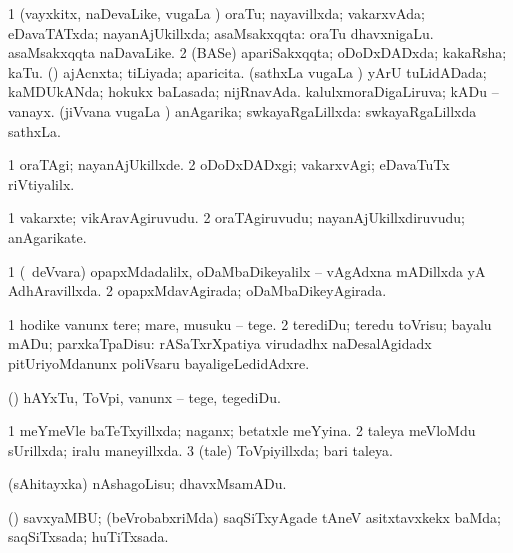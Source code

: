 {\bentry
{} 
\gl{\gu}
\bmng
\bnum
\num{1} (vayxkitx, naDevaLike, \mo vugaLa \vi) oraTu; nayavillxda; vakarxvAda; eDavaTATxda; nayanAjUkillxda; asaMsakxqqta:  oraTu dhavxnigaLu.  asaMsakxqqta naDavaLike. 
\num{2} (BASe) apariSakxqqta; oDoDxDADxda; kakaRsha; kaTu. 
 (\pArxparx) 
\banum
{} ajAcnxta; tiLiyada; aparicita. 
 (sathxLa \mo vugaLa \vi) yArU tuLidADada; kaMDUkANda; hokukx baLasada; nijRnavAda. 
 kalulxmoraDigaLiruva; kADu -- vanayx. 
 (jiVvana \mo vugaLa \vi) anAgarika; swkayaRgaLillxda:  swkayaRgaLillxda sathxLa. 
\eanum
\numie
\enum
\emng
\eentry

\bentry
{} 
\gl{\kirxvi}
\bmng
\bnum
\num{1} oraTAgi; nayanAjUkillxde. 
\num{2} oDoDxDADxgi; vakarxvAgi; eDavaTuTx riVtiyalilx. 
\enum
\emng
\eentry

\bentry
{} 
\gl{\nA}
\expl{}
\bmng
\bnum
\num{1} vakarxte; vikAravAgiruvudu. 
\num{2} oraTAgiruvudu; nayanAjUkillxdiruvudu; anAgarikate. 
\enum
\emng
\eentry

\bentry
{} 
\gl{\gu}
\expl{}
\bmng
\bnum
\num{1} (\kanmu\ deVvara) opapxMdadalilx, oDaMbaDikeyalilx -- vAgAdxna mADillxda yA AdhAravillxda. 
\num{2} opapxMdavAgirada; oDaMbaDikeyAgirada. 
\enum
\emng
\eentry

\bentry
{} 
\gl{\sakirx}
\expl{}
\bmng
\bnum
\num{1} hodike \mo vanunx tere; mare, musuku -- tege. 
\num{2} terediDu; teredu toVrisu; bayalu mADu; parxkaTpaDisu:  rASaTxrXpatiya virudadhx naDesalAgidadx pitUriyoMdanunx poliVsaru bayaligeLedidAdxre. 
\enum
\emng

\noindent 
\gl{\akirx}
\expl{}
\bmng
(\pArxparx) hAYxTu, ToVpi, \mo vanunx -- tege, tegediDu. 
\emng
\eentry

\bentry
{} 
\gl{\gu}
\expl{}
\bmng
\bnum
\num{1} meYmeVle baTeTxyillxda; naganx; betatxle meYyina. 
\num{2} taleya meVloMdu sUrillxda; iralu maneyillxda. 
\num{3} (tale) ToVpiyillxda; bari taleya. 
\enum
\emng
\eentry

\bentry
{} 
\gl{\akirx}
\expl{}
\bmng
 (sAhitayxka) nAshagoLisu; dhavxMsamADu. 
\emng
\eentry

\bentry
{} 
\gl{\gu}
\expl{}
\bmng
 (\pArxparx) savxyaMBU; (beVrobabxriMda) saqSiTxyAgade tAneV asitxtavxkekx baMda; saqSiTxsada; huTiTxsada. 
\emng
\eentry

}
